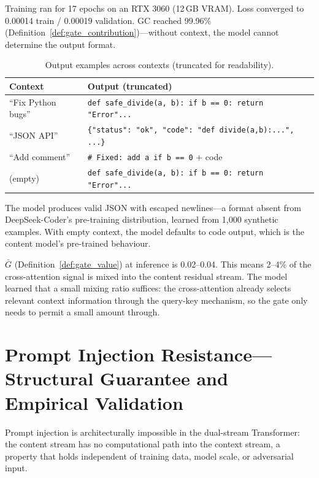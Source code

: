\documentclass[11pt,a4paper]{article}
\theoremstyle{definition}
\begin{document}
Training ran for 17 epochs on an RTX 3060 (12\,GB VRAM). Loss converged to 0.00014 train / 0.00019 validation. $\text{GC}$ reached 99.96\% (Definition~\ref{def:gate_contribution})---without context, the model cannot determine the output format.

\begin{table}[H]
  \centering
  \caption{Output examples across contexts (truncated for readability).}
  \label{tab:output_formats}
  \begin{tabular}{p{3.5cm}p{9.5cm}}
    \toprule
    Context & Output (truncated) \\
    \midrule
    ``Fix Python bugs'' & \texttt{def safe\_divide(a, b): if b == 0: return "Error"...} \\
    ``JSON API'' & \texttt{\{"status": "ok", "code": "def divide(a,b):...", ...\}} \\
    ``Add comment'' & \texttt{\# Fixed: add a if b == 0} + code \\
    (empty) & \texttt{def safe\_divide(a, b): if b == 0: return "Error"...} \\
    \bottomrule
  \end{tabular}
\end{table}

The model produces valid JSON with escaped newlines---a format absent from DeepSeek-Coder's pre-training distribution, learned from 1,000 synthetic examples. With empty context, the model defaults to code output, which is the content model's pre-trained behaviour.

$\bar{G}$ (Definition~\ref{def:gate_value}) at inference is 0.02--0.04. This means 2--4\% of the cross-attention signal is mixed into the content residual stream. The model learned that a small mixing ratio suffices: the cross-attention already selects relevant context information through the query-key mechanism, so the gate only needs to permit a small amount through.

\section{Prompt Injection Resistance---Structural Guarantee and Empirical Validation}

Prompt injection is architecturally impossible in the dual-stream Transformer: the content stream has no computational path into the context stream, a property that holds independent of training data, model scale, or adversarial input.
\end{document}
